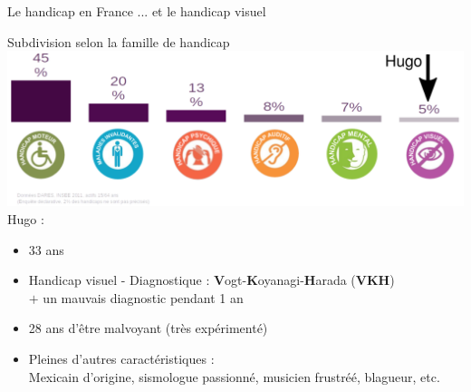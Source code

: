 \documentclass{beamer}
\begin{document}
\begin{frame}
 {Le handicap en France ... et le handicap visuel } 

 \vskip -0.2cm \small Subdivision selon la famille de handicap \\
 \vskip 0.1cm
    \includegraphics[width=1\linewidth]{images/handicaps.png} \\
\vskip -0.5cm Hugo : \pause
\vskip -0.2cm \begin{itemize}
 \item 33 ans \pause
 \item Handicap visuel - Diagnostique : \textbf{V}ogt-\textbf{K}oyanagi-\textbf{H}arada (\textbf{VKH}) \\
 \pause $+$ un mauvais diagnostic pendant 1 an \pause
 \item 28 ans d'être malvoyant (très expérimenté) \pause 
 \item Pleines d'autres caractéristiques : \\ \pause 
       Mexicain d'origine, sismologue passionné, musicien frustré\'e, blagueur, etc.
\end{itemize}


 
\end{frame}
\end{document}
